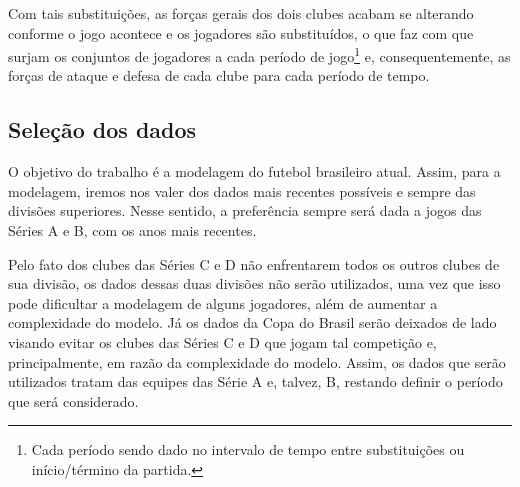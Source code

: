Com tais substituições, as forças gerais dos dois clubes acabam se alterando conforme o jogo acontece e os jogadores são substituídos, o que faz com que surjam os conjuntos de jogadores a cada período de jogo\footnote{Cada período sendo dado no intervalo de tempo entre substituições ou início/término da partida.} e, consequentemente, as forças de ataque e defesa de cada clube para cada período de tempo.

\subsection{Seleção dos dados}
\label{selecao_de_dados}

O objetivo do trabalho é a modelagem do futebol brasileiro atual. Assim, para a modelagem, iremos nos valer dos dados mais recentes possíveis e sempre das divisões superiores. Nesse sentido, a preferência sempre será dada a jogos das Séries A e B, com os anos mais recentes.

Pelo fato dos clubes das Séries C e D não enfrentarem todos os outros clubes de sua divisão, os dados dessas duas divisões não serão utilizados, uma vez que isso pode dificultar a modelagem de alguns jogadores, além de aumentar a complexidade do modelo. Já os dados da Copa do Brasil serão deixados de lado visando evitar os clubes das Séries C e D que jogam tal competição e, principalmente, em razão da complexidade do modelo. Assim, os dados que serão utilizados tratam das equipes das Série A e, talvez, B, restando definir o período que será considerado.

